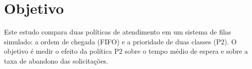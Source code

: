 \section{Objetivo}
Este estudo compara duas políticas de atendimento em um sistema de filas simulado: a ordem de chegada (FIFO) e a prioridade de duas classes (P2).
O objetivo é medir o efeito da política P2 sobre o tempo médio de espera e sobre a taxa de abandono das solicitações.
